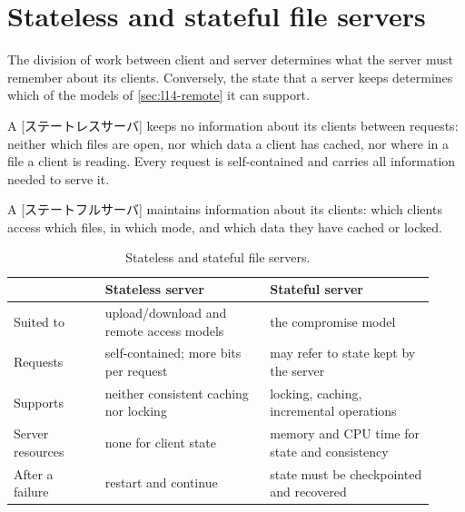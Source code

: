 \documentclass[../main.tex]{subfiles}
\begin{document}
\section{Stateless and stateful file servers}
\label{sec:l14-state}

The division of work between client and server
determines what the server must remember about its clients.  Conversely, the state that a server keeps determines which of the models
of \cref{sec:l14-remote} it can support.

\begin{definition}
  A [ステートレスサーバ] keeps no information about
  its clients between requests: neither which files are open, nor which
  data a client has cached, nor where in a file a client is reading.  Every
  request is self-contained and carries all information needed to serve
  it.
\end{definition}

\begin{definition}
  A [ステートフルサーバ] maintains information about
  its clients: which clients access which files, in which mode, and which
  data they have cached or locked.
\end{definition}

\begin{table}[htbp]
  \centering
  \caption{Stateless and stateful file servers.}
  \label{tab:l14-state}
  \small
  \begin{tabular}{@{}>{\raggedright\arraybackslash}p{0.2\linewidth}>{\raggedright\arraybackslash}p{0.36\linewidth}>{\raggedright\arraybackslash}p{0.36\linewidth}@{}}
    \toprule
    & Stateless server & Stateful server \\
    \midrule
    Suited to & upload/download and remote access models & the compromise
      model \\
    Requests & self-contained; more bits per request & may refer to state
      kept by the server \\
    Supports & neither consistent caching nor locking & locking, caching,
      incremental operations \\
    Server resources & none for client state & memory and CPU time for state
      and consistency \\
    After a failure & restart and continue & state must be checkpointed and
      recovered \\
    \bottomrule
  \end{tabular}
\end{table}
\end{document}
